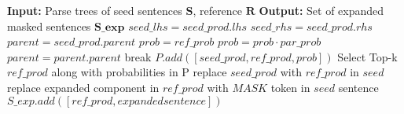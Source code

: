 \begin{algorithm}
  \caption{\ProdDiffAlgCaption}
  \begin{algorithmic}[1]
    \State \textbf{Input:} Parse trees of seed sentences $\textbf{S}$,
    reference \pcfg$\textbf{R}$
    \State \textbf{Output:} Set of expanded masked sentences $\textbf{S\_exp}$
        \State $seed\_lhs = seed\_prod.lhs$
        \State $seed\_rhs = seed\_prod.rhs$
            \State $parent = seed\_prod.parent$
            \State $prob = ref\_prob$
                  \State $prob = prob \cdot par\_prob$
                  \State $parent = parent.parent$
                  \State break
                \EndIf
              \EndFor  
            \EndWhile
            \State $P.add([seed\_prod, ref\_prod, prob])$
          \EndIf
        \EndFor
      \EndFor
        \State Select Top-k $ref\_prod$ along with probabilities in P
          \State replace $seed\_prod$ with $ref\_prod$ in $seed$
          \State replace expanded component in $ref\_prod$ with $MASK$
          token in $seed$ sentence
          \State $S\_exp.add([ref\_prod, expanded sentence])$
        \EndFor
      \EndIf
    \EndFor
  \end{algorithmic}
\end{algorithm}
